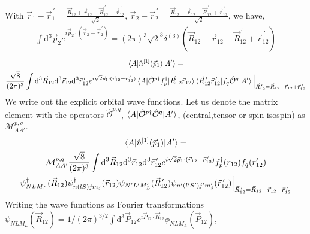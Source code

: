 \documentclass[10pt]{article}
\begin{document}
With $ \vec{r}_{1} - \vec{r}_{1}^{\, \prime} = \frac{\vec{R}_{12} + \vec{r}_{12} - \vec{R}_{12}^{\, \prime} - \vec{r}_{12}^{\, \prime}}{\sqrt{2}}$, $\vec{r}_{2} - \vec{r}_{2}^{\, \prime} = \frac{\vec{R}_{12} - \vec{r}_{12} - \vec{R}_{12}^{\, \prime} + \vec{r}_{12}^{\, \prime}}{\sqrt{2}}$, we have,
\begin{align*}
	\int \text{d}^{3} \vec{p}_{2} e^{ i \vec{p}_{2} \cdot ( \vec{r}_{2} - \vec{r}_{2}^{\, \prime} )} = (2 \pi)^{3} \sqrt{2}^{3} \delta^{(3)}( \vec{R}_{12} - \vec{r}_{12} - \vec{R}_{12}^{\, \prime} + \vec{r}_{12}^{\, \prime} )
\end{align*}
\begin{multline*}
	\braket{ A | \hat{n}^{[1]}(\vec{p}_1) | A'} = \\
  \frac{\sqrt{8}}{(2 \pi)^{3}} \int \text{d}^{3} \vec{R}_{12} \text{d}^{3} \vec{r}_{12} \text{d}^{3} \vec{r}_{12}^{\, \prime}  e^{ i \sqrt{2} \vec{p}_{1} \cdot ( \vec{r}_{12} - \vec{r}_{12}^{\, \prime}) } \braket{ A | \hat{\mathcal{O}}^{p\dagger} f_{p}^{\dagger} | \vec{R}_{12} \vec{r}_{12} } \braket{ \vec{R}_{12}^{\, \prime} \vec{r}_{12}^{\, \prime} | f_{q} \hat{ \mathcal{O}}^{q} | A'} \Big|_{\vec{R}_{12}^{\, \prime} = \vec{R}_{12} - \vec{r}_{12}  + \vec{r}_{12}^{\, \prime} }
\end{multline*}
We write out the explicit orbital wave functions. Let us denote the matrix element with the operators $\hat{\mathcal{O}}^{p,q}$, $ \braket{ A | \hat{\mathcal{O}}^{p\dagger} \hat{ \mathcal{O}}^{q} | A'}$, (central,tensor or spin-isospin) as $\mathcal{M}_{A A'}^{p,q}$.
\begin{multline*}
	\braket{ A | \hat{n}^{[1]}(\vec{p}_1) | A'} = \\
  \mathcal{M}_{A A'}^{p,q} \frac{\sqrt{8}}{(2 \pi)^{3}} \int \text{d}^{3} \vec{R}_{12} \text{d}^{3} \vec{r}_{12} \text{d}^{3} \vec{r}_{12}^{\, \prime}  e^{ i \sqrt{2} \vec{p}_{1} \cdot ( \vec{r}_{12} - \vec{r}_{12}^{\, \prime}) } f_{p}^{\dagger}(r_{12}) f_{q}(r_{12}') \\
   \psi_{N L M_L}^{\dagger}(\vec{R}_{12}) \psi_{ n (lS) j m_j}^{\dagger}(\vec{r}_{12}) \psi_{N' L' M_L'}(\vec{R}_{12}^{\, \prime}) \psi_{ n' (l'S') j' m_j'}(\vec{r}_{12}^{\, \prime}) \Big|_{\vec{R}_{12}^{\, \prime} = \vec{R}_{12} - \vec{r}_{12}  + \vec{r}_{12}^{\, \prime} }
\end{multline*}
Writing the wave functions as Fourier transformations $ \psi_{N L M_L}(\vec{R}_{12}) = 1/(2 \pi)^{3/2} \int \text{d}^{3} \vec{P}_{12} e^{ i \vec{P}_{12} \cdot \vec{R}_{12}} \phi_{N L M_L}(\vec{P}_{12})$,
\end{document}
